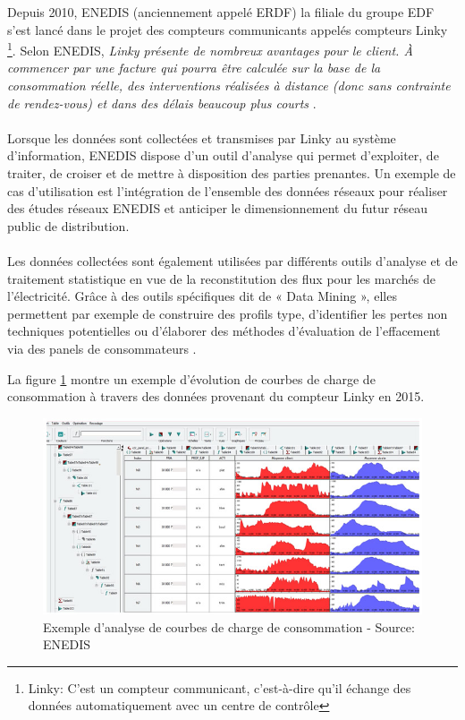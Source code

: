 \documentclass[11pt,a4paper]{report}
\begin{document}
Depuis 2010, ENEDIS (anciennement appelé ERDF) la filiale du groupe EDF s'est lancé dans le projet des compteurs communicants appelés compteurs Linky \footnote{Linky: C'est un compteur communicant, c'est-à-dire qu'il échange des données automatiquement avec un centre de contrôle}. Selon ENEDIS, \textit{Linky présente de nombreux avantages pour le client. À commencer par une facture qui pourra être calculée sur la base de la consommation réelle, des interventions réalisées à distance (donc sans contrainte de rendez-vous) et dans des délais beaucoup plus courts} \cite{linky}.\\\\
Lorsque les données sont collectées et transmises par Linky au système d'information, ENEDIS dispose d'un outil d'analyse qui permet d'exploiter, de traiter, de croiser et de mettre à disposition des parties prenantes. Un exemple de cas d'utilisation est l'intégration de l'ensemble des données réseaux pour réaliser des études réseaux ENEDIS et anticiper le dimensionnement du futur réseau public de distribution. \\\\
Les données collectées sont également utilisées par différents outils d’analyse et de traitement statistique en vue de la reconstitution des flux pour les marchés de l’électricité. Grâce à des outils spécifiques dit de « Data Mining », elles permettent par exemple de construire des profils type, d’identifier les pertes non techniques potentielles ou d’élaborer des méthodes d’évaluation de l’effacement via des panels de consommateurs \cite{linky2}.

 La figure \ref{enedis} montre un exemple d'évolution de courbes de charge de consommation à travers des données provenant du compteur Linky en 2015.
\newpage

 \begin{figure}[h]
   \centering
   \includegraphics[scale=0.5]{enedis.jpg}
      \caption{Exemple d'analyse de courbes de charge de consommation - Source: ENEDIS}
      \label{enedis}
\end{figure}
\end{document}
